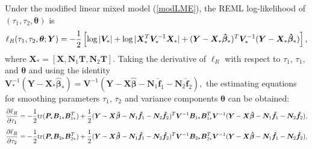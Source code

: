 \documentclass[article,lineno]{biometrika}
\begin{document}
Under the  modified linear mixed model (\ref{modLME}), the REML log-likelihood of $(\tau_1, \tau_2, \boldsymbol \theta)$ is 
$$
\ell_R(\tau_1, \tau_2, \bm \theta; \bm Y) 
 =
 -{1\over 2}  
\left[
 \log |\bm  V_*|  +  \log |\bm X_*^T \bm V_*^{-1} \bm X_*| 
 +  (\bm Y - \bm X_* \bm {\hat \beta}_*)^T 
 \bm V_* ^{-1}  
 (\bm Y - \bm X_* \bm {\hat \beta}_*) 
\right],
$$
where 
$\bm X_* = [\bm X, \bm N_1 \bm T, \bm N_2 \bm T]$. 
Taking the derivative of $\ell_R$ with respect to $\tau_1$, $\tau_1$, and $\boldsymbol \theta$ and using the identity 
$
\boldsymbol V^{-1}_*
(\boldsymbol Y - \boldsymbol X_* \boldsymbol   {\hat \beta}_*) 
=
\boldsymbol V^{-1} 
(\boldsymbol Y - \boldsymbol X \boldsymbol {\hat\beta} 
- \boldsymbol N_1 \boldsymbol {\hat f}_1
 - \boldsymbol N_2 \boldsymbol {\hat f}_2),
$
the estimating equations for smoothing parameters $\tau_1$, $\tau_2$ 
and variance components $\boldsymbol \theta$  can be obtained:
\begin{equation} \label{score_tau1}
{\partial \ell_R  \over \partial \tau_1}
=
- {1 \over 2}
{\rm tr} (\boldsymbol P_* \boldsymbol B_{1*} \boldsymbol B_{1*}^T) 
+ {1 \over 2} 
(\boldsymbol Y - \boldsymbol X \boldsymbol {\hat\beta} - \boldsymbol N_1 \boldsymbol {\hat f}_1
 - \boldsymbol N_2 \boldsymbol {\hat f}_2)^T
\boldsymbol V^{-1}  
\boldsymbol B_{1*} \boldsymbol B_{1*}^T
\boldsymbol V^{-1}  
(\boldsymbol Y - \boldsymbol X \boldsymbol {\hat\beta} - \boldsymbol N_1 \boldsymbol {\hat f}_1
 - \boldsymbol N_2 \boldsymbol {\hat f}_2),
\end{equation}
\begin{equation} \label{score_tau2}
{\partial \ell_R  \over \partial \tau_2}
=
- {1 \over 2}
{\rm tr} (\boldsymbol P_* \boldsymbol B_{2*} \boldsymbol B_{2*}^T)
+ {1 \over 2} 
(\boldsymbol Y - \boldsymbol X \boldsymbol {\hat\beta} - \boldsymbol N_1 \boldsymbol {\hat f}_1
 - \boldsymbol N_2 \boldsymbol {\hat f}_2)^T
\boldsymbol V^{-1}  
\boldsymbol B_{2*} \boldsymbol B_{2*}^T
\boldsymbol V^{-1}  
(\boldsymbol Y - \boldsymbol X \boldsymbol {\hat\beta} - \boldsymbol N_1 \boldsymbol {\hat f}_1
 - \boldsymbol N_2 \boldsymbol {\hat f}_2),
\end{equation}
\end{document}
